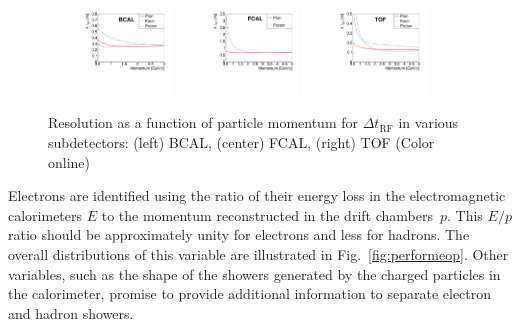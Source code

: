 \begin{figure}[tbp]
\begin{center}          
\includegraphics[width=0.29\textwidth]{figures/bcal_deltat_resol.pdf}
\includegraphics[width=0.29\textwidth]{figures/fcal_deltat_resol.pdf}
\includegraphics[width=0.29\textwidth]{figures/tof_deltat_resol.pdf}

\caption{\label{fig:timingresol}
Resolution as a function of particle momentum for  $\Delta t_\mathrm{RF}$ in various subdetectors: (left) BCAL, (center) FCAL, (right) TOF
 (Color online)}
\end{center}
\end{figure}


Electrons are identified using the ratio of their energy loss in the electromagnetic calorimeters $E$ to the momentum reconstructed in the drift chambers~$p$.  This $E/p$ ratio should be approximately unity for electrons and less for hadrons.  The overall distributions of this variable are illustrated 
in  Fig.~\ref{fig:performeop}.  Other variables, such as the shape of the showers generated by the charged particles in the calorimeter, promise to provide additional information to separate electron and hadron showers.

